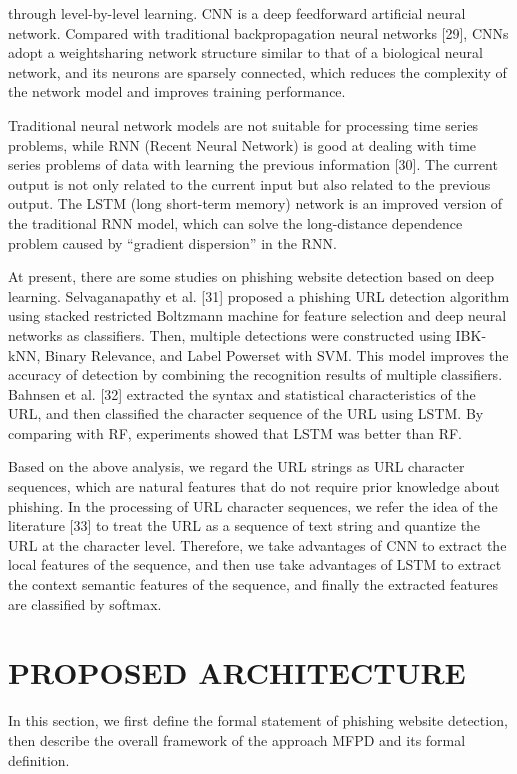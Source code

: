 \documentclass{ieeeaccess}
\begin{document}
through level-by-level learning. CNN is a deep feedforward
artificial neural network. Compared with traditional backpropagation
neural networks [29], CNNs adopt a weightsharing
network structure similar to that of a biological neural network, and its neurons are sparsely connected, which
reduces the complexity of the network model and improves
training performance.\par Traditional neural network models are not suitable for
processing time series problems, while RNN (Recent Neural
Network) is good at dealing with time series problems of
data with learning the previous information [30]. The current
output is not only related to the current input but also
related to the previous output. The LSTM (long short-term
memory) network is an improved version of the traditional
RNN model, which can solve the long-distance dependence
problem caused by ``gradient dispersion'' in the RNN.\par At present, there are some studies on phishing website
detection based on deep learning. Selvaganapathy et al. [31]
proposed a phishing URL detection algorithm using stacked
restricted Boltzmann machine for feature selection and deep
neural networks as classifiers. Then, multiple detections were
constructed using IBK-kNN, Binary Relevance, and Label
Powerset with SVM. This model improves the accuracy of
detection by combining the recognition results of multiple
classifiers. Bahnsen et al. [32] extracted the syntax and statistical
characteristics of the URL, and then classified the
character sequence of the URL using LSTM. By comparing
with RF, experiments showed that LSTM was better than RF.\par Based on the above analysis, we regard the URL strings
as URL character sequences, which are natural features that
do not require prior knowledge about phishing. In the processing
of URL character sequences, we refer the idea of
the literature [33] to treat the URL as a sequence of text
string and quantize the URL at the character level. Therefore,
we take advantages of CNN to extract the local features of the
sequence, and then use take advantages of LSTM to extract
the context semantic features of the sequence, and finally the
extracted features are classified by softmax.
\section{PROPOSED ARCHITECTURE}
In this section, we first define the formal statement of phishing
website detection, then describe the overall framework of
the approach MFPD and its formal definition.
\end{document}
